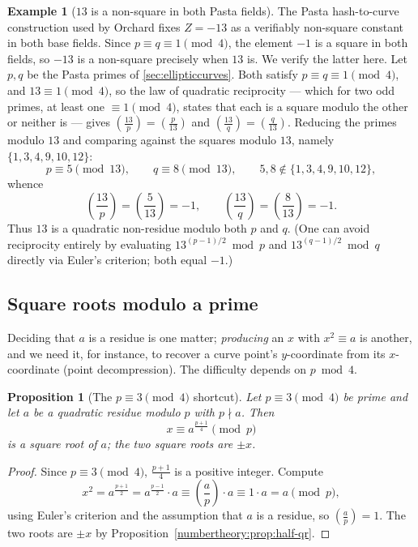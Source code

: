 \documentclass[11pt,a4paper]{article}
\newtheorem{proposition}[theorem]{Proposition}
\theoremstyle{definition}
\newtheorem{example}[theorem]{Example}
\theoremstyle{remark}
\newcommand{\legendre}[2]{\left(\frac{#1}{#2}\right)}
\begin{document}
\begin{example}[\(13\) is a non-square in both Pasta fields]\label{numbertheory:ex:pasta-nonsquare}
The Pasta hash-to-curve construction used by Orchard fixes \(Z = -13\) as a verifiably non-square constant in both base fields. Since \(p \equiv q \equiv 1 \pmod 4\), the element \(-1\) is a square in both fields, so \(-13\) is a non-square precisely when \(13\) is. We verify the latter here. Let \(p, q\) be the Pasta primes of \cref{sec:ellipticcurves}. Both satisfy \(p \equiv q \equiv 1 \pmod 4\), and \(13 \equiv 1 \pmod 4\), so the law of quadratic reciprocity --- which for two odd primes, at least one \(\equiv 1 \pmod 4\), states that each is a square modulo the other or neither is --- gives \(\legendre{13}{p} = \legendre{p}{13}\) and \(\legendre{13}{q} = \legendre{q}{13}\). Reducing the primes modulo \(13\) and comparing against the squares modulo \(13\), namely \(\{1, 3, 4, 9, 10, 12\}\):
\[
p \equiv 5 \pmod{13}, \qquad q \equiv 8 \pmod{13}, \qquad 5, 8 \notin \{1,3,4,9,10,12\},
\]
whence
\[
\legendre{13}{p} = \legendre{5}{13} = -1, \qquad \legendre{13}{q} = \legendre{8}{13} = -1 .
\]
Thus \(13\) is a quadratic non-residue modulo both \(p\) and \(q\). (One can avoid reciprocity entirely by evaluating \(13^{(p-1)/2} \bmod p\) and \(13^{(q-1)/2} \bmod q\) directly via Euler's criterion; both equal \(-1\).)
\end{example}

\subsection{Square roots modulo a prime}\label{numbertheory:subsec:sqrt}

Deciding that \(a\) is a residue is one matter; \emph{producing} an \(x\) with \(x^2 \equiv a\) is another, and we need it, for instance, to recover a curve point's \(y\)-coordinate from its \(x\)-coordinate (point decompression). The difficulty depends on \(p \bmod 4\).

\begin{proposition}[The \(p \equiv 3 \pmod 4\) shortcut]\label{numbertheory:prop:sqrt-3mod4}
Let \(p \equiv 3 \pmod 4\) be prime and let \(a\) be a quadratic residue modulo \(p\) with \(p \nmid a\). Then
\[
x \equiv a^{\frac{p+1}{4}} \pmod p
\]
is a square root of \(a\); the two square roots are \(\pm x\).
\end{proposition}

\begin{proof}
Since \(p \equiv 3 \pmod 4\), \(\tfrac{p+1}{4}\) is a positive integer. Compute
\[
x^2 = a^{\frac{p+1}{2}} = a^{\frac{p-1}{2}}\cdot a \equiv \legendre{a}{p}\cdot a \equiv 1 \cdot a = a \pmod p,
\]
using Euler's criterion and the assumption that \(a\) is a residue, so \(\legendre{a}{p}=1\). The two roots are \(\pm x\) by Proposition~\ref{numbertheory:prop:half-qr}.
\end{proof}
\end{document}

